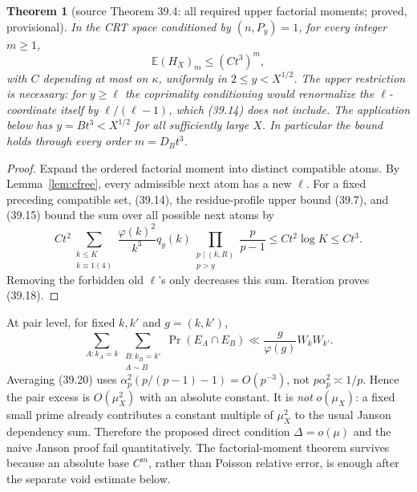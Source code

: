 \documentclass[10pt,reqno]{amsart}
\newtheorem{theorem}{Theorem}[section]
\theoremstyle{definition}
\newcommand{\1}{\mathbf 1}
\begin{document}
\begin{theorem}[source Theorem 39.4: all required upper factorial moments;
proved, provisional]\label{thm:factorial-cfree}
In the CRT space conditioned by $(n,P_y)=1$, for every integer $m\geq1$,
\begin{equation}\tag{39.18}
 \mathbb E(H_X)_m\leq(Ct^3)^m,
\end{equation}
with $C$ depending at most on $\kappa$, uniformly in
$2\leq y<X^{1/2}$.  The upper restriction is necessary: for $y\geq\ell$
the coprimality conditioning would renormalize the $\ell$-coordinate itself
by $\ell/(\ell-1)$, which (39.14) does not include.  The application below
has $y=Bt^3<X^{1/2}$ for all sufficiently large $X$.  In particular the
bound holds through every order $m=D_Bt^3$.
\end{theorem}
\begin{proof}
Expand the ordered factorial moment into distinct compatible atoms.  By
Lemma~\ref{lem:cfree}, every admissible next atom has a new $\ell$.  For a
fixed preceding compatible set, (39.14), the residue-profile upper bound
(39.7), and (39.15) bound the sum over all possible next atoms by
\begin{equation}\tag{39.19}
 Ct^2\sum_{\substack{k\leq K\\k\equiv1(4)}}
 \frac{\varphi(k)^2}{k^3}q_y(k)
 \prod_{\substack{p\mid(k,R)\\p>y}}\frac p{p-1}
 \leq Ct^2\log K\leq Ct^3.
\end{equation}
Removing the forbidden old $\ell$'s only decreases this sum.  Iteration
proves (39.18).
\end{proof}

At pair level, for fixed $k,k'$ and $g=(k,k')$,
\begin{equation}\tag{39.20}
 \sum_{A:k_A=k}\sum_{\substack{B:k_B=k'\\A\sim B}}
 \Pr(E_A\cap E_B)
 \ll\frac g{\varphi(g)}W_kW_{k'}.
\end{equation}
Averaging (39.20) uses
$\alpha_p^2(p/(p-1)-1)=O(p^{-3})$, not
$p\alpha_p^2\asymp1/p$.  Hence the pair excess is $O(\mu_X^2)$ with an
absolute constant.  It is \emph{not} $o(\mu_X)$: a fixed small prime already
contributes a constant multiple of $\mu_X^2$ to the usual Janson dependency
sum.  Therefore the proposed direct condition $\Delta=o(\mu)$ and the naive
Janson proof fail quantitatively.  The factorial-moment theorem survives
because an absolute base $C^m$, rather than Poisson relative error, is enough
after the separate void estimate below.
\end{document}
